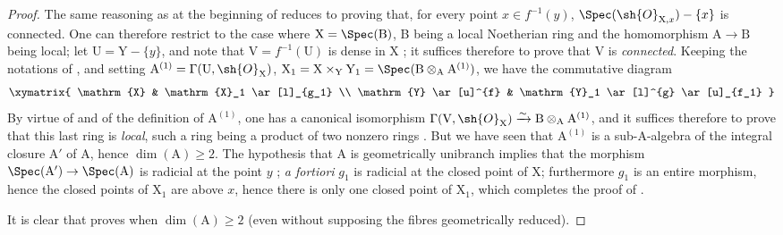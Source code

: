 \begin{proof}
The same reasoning as at the beginning of  reduces to proving that, for every point $x\in f^{-1}(y)$, $\Spec(\sh{O}_{\mathrm{X},x})-\{x\}$ is connected.
One can therefore restrict to the case where $\mathrm{X}=\Spec(\mathrm{B})$, B being a local Noetherian ring and the homomorphism $\mathrm{A}\to\mathrm{B}$ being local;
let $\mathrm{U}=\mathrm{Y}-\{y\}$, and note that $\mathrm{V}=f^{-1}(\mathrm{U})$ is dense in X ;
it suffices therefore to prove that V is \emph{connected}.
Keeping the notations of , and setting $\mathrm{A}^{(1)}=\Gamma(\mathrm{U},\sh{O}_{\mathrm{X}})$, $\mathrm{X}_1=\mathrm{X}\times_{\mathrm{Y}}\mathrm{Y}_1=\Spec(\mathrm{B}\otimes_{\mathrm{A}}\mathrm{A}^{(1)})$, we have the commutative diagram
\[
  \xymatrix{
    \mathrm{X} & \mathrm{X}_1 \ar[l]_{g_1} \\
    \mathrm{Y} \ar[u]^{f} & \mathrm{Y}_1 \ar[l]^{g} \ar[u]_{f_1}
  }
\]
By virtue of  and of the definition of $\mathrm{A}^{(1)}$, one has a canonical isomorphism $\Gamma(\mathrm{V},\sh{O}_{\mathrm{X}})\xrightarrow{\sim}\mathrm{B}\otimes_{\mathrm{A}}\mathrm{A}^{(1)}$, and it suffices therefore to prove that this last ring is \emph{local}, such a ring being a product of two nonzero rings .
But we have seen  that $\mathrm{A}^{(1)}$ is a sub-A-algebra of the integral closure $\mathrm{A}'$ of A, hence $\dim(\mathrm{A})\geq 2$.
The hypothesis that A is geometrically unibranch implies that the morphism $\Spec(\mathrm{A}')\to\Spec(\mathrm{A})$ is radicial at the point $y$ ;
\emph{a fortiori} $g_1$ is radicial at the closed point of X;
furthermore $g_1$ is an entire morphism, hence the closed points of $\mathrm{X}_1$ are above $x$, hence there is only one closed point of $\mathrm{X}_1$, which completes the proof of .

It is clear that  proves  when $\dim(\mathrm{A})\geq 2$ (even without supposing the fibres geometrically reduced).


\end{proof}
